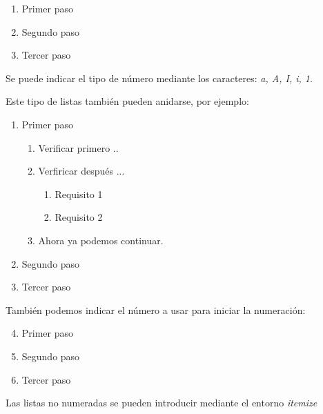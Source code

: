 \documentclass[letterpaper,12pt]{book}
\begin{document}

\bigskip

\begin{enumerate}[a]
	\item Primer paso
	\item Segundo paso
	\item Tercer paso
\end{enumerate}

Se puede indicar el tipo de número mediante los caracteres: \textit{a, A, I, i, 1}.

Este tipo de listas también pueden anidarse, por ejemplo:

\begin{enumerate}
	\item Primer paso
		\begin{enumerate}
			\item Verificar primero ..
			\item Verfiricar después ...
				\begin{enumerate}
					\item Requisito 1
					\item Requisito 2
				\end{enumerate}
			\item Ahora ya podemos continuar.
		\end{enumerate}
	\item Segundo paso
	\item Tercer paso
\end{enumerate}

También podemos indicar el número a usar para iniciar la numeración:

\begin{enumerate}
	\setcounter{enumi}{3}
	\item Primer paso
	\item Segundo paso
	\item Tercer paso
\end{enumerate}


Las listas no numeradas se pueden introducir mediante el entorno \textit{itemize} 
\end{document}
